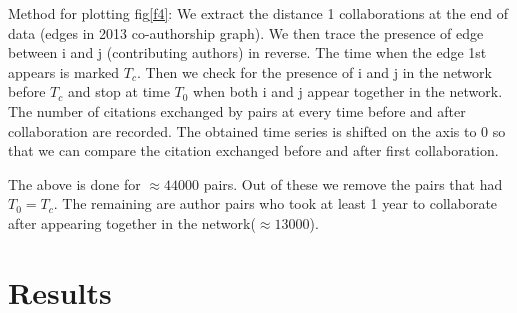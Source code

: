 \documentclass[aps, pre, twocolumn, nofootinbib]{revtex4-1}
\begin{document}

Method for plotting fig\ref{f4}: We extract the distance 1 collaborations at the end of data (edges in 2013 co-authorship graph). We then trace the presence of edge between i and j (contributing authors) in reverse. The time when the edge 1st appears is marked $T_c$. Then we check for the presence of i and j in the network before $T_c$ and stop at time $T_0$ when both i and j appear together in the network. The number of citations exchanged by pairs at every time before and after collaboration are recorded. The obtained time series is shifted on the axis to 0 so that we can compare the citation exchanged before and after first collaboration.

The above is done for $\approx 44000$ pairs. Out of these we remove the pairs that had $T_0 = T_c$. The remaining are author pairs who took at least 1 year to collaborate after appearing together in the network($\approx 13000$).  

\section{Results}
\end{document}
